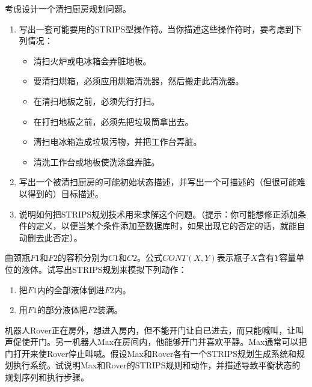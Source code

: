 \begin{question}
考虑设计一个清扫厨房规划问题。
	\begin{enumerate}
	\item 写出一套可能要用的STRIPS型操作符。当你描述这些操作符时，要考虑到下列情况： 
		\begin{itemize}
		\item 清扫火炉或电冰箱会弄脏地板。
		\item 要清扫烘箱，必须应用烘箱清洗器，然后搬走此清洗器。
		\item 在清扫地板之前，必须先行打扫。
		\item 在打扫地板之前，必须先把垃圾筒拿出去。
		\item 清扫电冰箱造成垃圾污物，并把工作台弄脏。
		\item 清洗工作台或地板使洗涤盘弄脏。 
		\end{itemize}
	\item 写出一个被清扫厨房的可能初始状态描述，并写出一个可描述的（但很可能难以得到的）目标描述。 
	\item 说明如何把STRIPS规划技术用来求解这个问题。（提示：你可能想修正添加条件的定义，以便当某个条件添加至数据库时，如果出现它的否定的话，就能自动删去此否定）。 
	\end{enumerate}
\end{question}
\begin{solution}
\end{solution}

\begin{question}
曲颈瓶$F1$和$F2$的容积分别为$C1$和$C2$。公式$CONT(X,Y)$表示瓶子$X$含有$Y$容量单位的液体。试写出STRIPS规划来模拟下列动作：
\begin{enumerate}
	\item 把$F1$内的全部液体倒进$F2$内。
	\item 用$F1$的部分液体把$F2$装满。   
\end{enumerate}
\end{question}
\begin{solution}
\end{solution}

\begin{question}
机器人Rover正在房外，想进入房内，但不能开门让自已进去，而只能喊叫，让叫声促使开门。另一机器人Max在房间内，他能够开门并喜欢平静。Max通常可以把门打开来使Rover停止叫喊。假设Max和Rover各有一个STRIPS规划生成系统和规划执行系统。试说明Max和Rover的STRIPS规则和动作，并描述导致平衡状态的规划序列和执行步骤。  
\end{question}
\begin{solution}
\end{solution}

